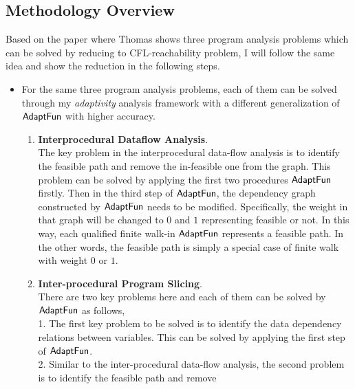  \subsection*{Methodology Overview}
\label{sec:cfl-methodology}
Based on the paper\cite{Reps98} where Thomas shows 
three program analysis problems 
which can be solved by reducing to CFL-reachability problem, I will follow the same idea and show the reduction
in the following steps.
\begin{itemize}
 \item For the same three program analysis problems, each of them 
 can be solved through my \emph{adaptivity} analysis framework with 
 a different generalization of $\textsf{AdaptFun}$ with higher accuracy.
 \begin{enumerate}
    \item \textbf{Interprocedural Dataflow Analysis}.
    \\
The key problem in the interprocedural data-flow analysis is to identify the feasible path and remove 
the in-feasible one from the graph.
This problem can be solved by applying the first two procedures $\textsf{AdaptFun}$ firstly.
Then in the third step of  $\textsf{AdaptFun}$, the dependency graph constructed by $\textsf{AdaptFun}$ needs to be modified.
Specifically, the weight in that graph will be changed to $0$ and $1$ 
representing feasible or not. 
In this way, each qualified finite walk-in 
$\textsf{AdaptFun}$ represents a feasible path.
In the other words, the feasible path is simply a special case of finite walk 
with weight $0$ or $1$.
\item \textbf{Inter-procedural Program Slicing}.
\\
There are two key problems here and each of them can be solved by $\textsf{AdaptFun}$ as follows,
\\ 
1. The first key problem to be solved is to identify the data dependency relations between variables. 
This can be solved by applying the first step of $\textsf{AdaptFun}$.
\\
2. Similar to the inter-procedural data-flow analysis, 
the second problem is to identify the feasible path and remove 

\end{enumerate}
\end{itemize}

